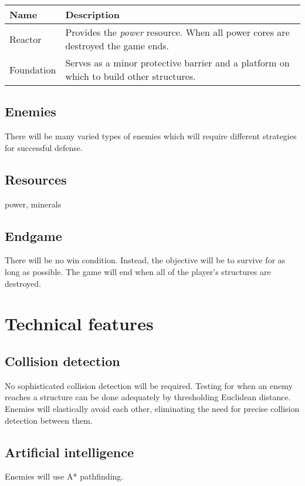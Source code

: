 \documentclass[a4paper,titlepage]{article}
\begin{document}
\begin{tabular}{lp{9cm}}
Name & Description \\ \hline
Reactor & Provides the \emph{power} resource.  When all power cores are destroyed the game ends. \\
Foundation & Serves as a minor protective barrier and a platform on which to build other structures. \\
\end{tabular}

\subsection{Enemies}

There will be many varied types of enemies which will require different strategies for successful defense.

\subsection{Resources}

power, minerals

\subsection{Endgame}

There will be no win condition.  Instead, the objective will be to survive for as long as possible.  The game will end when all of the player's structures are destroyed.

\section{Technical features}

\subsection{Collision detection}

No sophisticated collision detection will be required.  Testing for when an enemy reaches a structure can be done adequately by thresholding Euclidean distance.  Enemies will elastically avoid each other, eliminating the need for precise collision detection between them.

\subsection{Artificial intelligence}

Enemies will use A* pathfinding.
\end{document}
